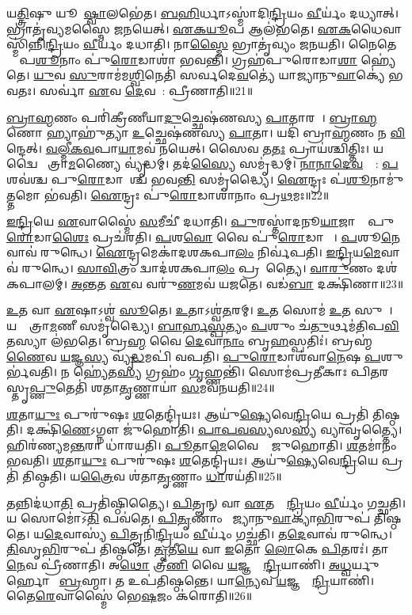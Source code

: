 𑌯\ul{𑌤𑍍𑌤𑍍𑌰𑌿}𑌷𑍁 𑌯𑍂𑌪𑍇᳚\ul{𑌷𑍍𑌵𑌾}𑌲𑌭𑍇॑𑌤।
\ul{𑌬}\ul{𑌹𑌿}𑌰𑍍𑌧𑌾\-𑌽𑌸𑍍𑌮𑌾॑𑌦𑌿\ul{𑌨𑍍𑌦𑍍𑌰𑌿}𑌯𑌂 \ul{𑌵𑍀}𑌰𑍍𑌯𑌂॑ 𑌦𑌧𑍍𑌯𑌾𑌤𑍍।
𑌭𑍍𑌰𑌾𑌤𑍃॑𑌵𑍍𑌯𑌮𑌸𑍍𑌮𑍈 𑌜𑌨𑌯𑍇𑌤𑍍।
\ul{𑌏}\ul{𑌕}\ul{𑌯𑍂}𑌪 𑌆𑌲॑𑌭𑌤𑍇।
\ul{𑌏}\ul{𑌕}𑌧𑍈𑌵𑌾𑌸𑍍𑌮𑌿॑𑌨𑍍𑌨𑌿\ul{𑌨𑍍𑌦𑍍𑌰𑌿}𑌯𑌂 \ul{𑌵𑍀}𑌰𑍍𑌯𑌂॑ 𑌦𑌧𑌾𑌤𑌿।
𑌨𑌾\ul{𑌸𑍍𑌮𑍈} 𑌭𑍍𑌰𑌾𑌤𑍃॑𑌵𑍍𑌯𑌂 𑌜𑌨𑌯𑌤𑌿।
𑌨𑍈𑌤𑍇𑌷𑌾𑌂᳚ 𑌪\ul{𑌶𑍂}𑌨𑌾𑌂 𑌪𑍁॑\ul{𑌰𑍋}𑌡𑌾𑌶𑌾॑ 𑌭𑌵𑌨𑍍𑌤𑌿।
𑌗𑍍𑌰𑌹॑𑌪𑍁𑌰𑍋𑌡𑌾\ul{𑌶𑌾} 𑌹𑍍𑌯𑍇॑𑌤𑍇।
\ul{𑌯𑍁}𑌵 \ul{𑌸𑍁}𑌰𑌾𑌮॑𑌮\ul{𑌶𑍍𑌵𑌿}𑌨𑍇𑌤𑌿॑ 𑌸𑌰𑍍𑌵𑌦𑍇\ul{𑌵}𑌤𑍍𑌯𑍇॑ 𑌯𑌾𑌜𑍍𑌯𑌾𑌨𑍁\ul{𑌵𑌾}𑌕𑍍𑌯𑍇॑ 𑌭𑌵𑌤𑌃।
𑌸𑌰𑍍𑌵𑌾॑ \ul{𑌏}𑌵 \ul{𑌦𑍇}𑌵𑌤𑌾᳚: 𑌪𑍍𑌰𑍀𑌣𑌾𑌤𑌿॥21॥

\ul{𑌬𑍍𑌰𑌾}\ul{𑌹𑍍𑌮}𑌣𑌂 𑌪𑌰𑌿॑𑌕𑍍𑌰𑍀𑌣𑍀𑌯𑌾\ul{𑌦𑍁}𑌚𑍍𑌛𑍇𑌷॑𑌣𑌸𑍍𑌯 \ul{𑌪𑌾}𑌤𑌾𑌰𑌮𑍍᳚।
\ul{𑌬𑍍𑌰𑌾}\ul{𑌹𑍍𑌮}𑌣𑍋 𑌹𑍍𑌯𑌾𑌹𑍁॑𑌤𑍍𑌯𑌾 \ul{𑌉}𑌚𑍍𑌛𑍇𑌷॑𑌣𑌸𑍍𑌯 \ul{𑌪𑌾}𑌤𑌾।
𑌯𑌦𑌿॑ 𑌬𑍍𑌰𑌾\ul{𑌹𑍍𑌮}𑌣𑌂 𑌨 \ul{𑌵𑌿}𑌨𑍍𑌦𑍇𑌤𑍍।
\ul{𑌵}\ul{𑌲𑍍𑌮𑍀}\ul{𑌕}\ul{𑌵}𑌪𑌾\ul{𑌯𑌾}𑌮𑌵॑ 𑌨𑌯𑍇𑌤𑍍।
𑌸𑍈𑌵 𑌤\ul{𑌤𑌃} 𑌪𑍍𑌰𑌾𑌯॑𑌶𑍍𑌚𑌿𑌤𑍍𑌤𑌿𑌃।
𑌯𑌦𑍍𑌵𑍈 𑌸𑍗᳚𑌤𑍍𑌰𑌾\ul{𑌮}𑌣𑍍𑌯𑍈 𑌵𑍍𑌯𑍃॑𑌦𑍍𑌧𑌮𑍍।
𑌤𑌦॑\ul{𑌸𑍍𑌯𑍈} 𑌸𑌮𑍃॑𑌦𑍍𑌧𑌮𑍍।
\ul{𑌨𑌾}\ul{𑌨𑌾}\ul{𑌦𑍇}\ul{𑌵}𑌤𑍍𑌯𑌾᳚: \ul{𑌪}𑌶𑌵॑𑌶𑍍𑌚 𑌪𑍁\ul{𑌰𑍋}𑌡𑌾𑌶𑌾᳚𑌶𑍍𑌚 𑌭𑌵\ul{𑌨𑍍𑌤𑌿} 𑌸𑌮𑍃॑𑌦𑍍𑌧𑍍𑌯𑍈।
\ul{𑌐}𑌨𑍍𑌦𑍍𑌰𑌃 𑌪॑\ul{𑌶𑍂}𑌨𑌾𑌮𑍁॑\ul{𑌤𑍍𑌤}𑌮𑍋 𑌭॑𑌵𑌤𑌿।
\ul{𑌐}𑌨𑍍𑌦𑍍𑌰𑌃 𑌪𑍁॑\ul{𑌰𑍋}𑌡𑌾𑌶𑌾॑𑌨𑌾𑌂 𑌪𑍍𑌰\ul{𑌥}𑌮𑌃॥22॥

\ul{𑌇}\ul{𑌨𑍍𑌦𑍍𑌰𑌿}𑌯𑍇 \ul{𑌏}𑌵𑌾𑌸𑍍𑌮𑍈॑ \ul{𑌸}𑌮𑍀𑌚𑍀॑ 𑌦𑌧𑌾𑌤𑌿।
\ul{𑌪𑍁}𑌰𑌸𑍍𑌤𑌾॑𑌦𑌨𑍂\ul{𑌯𑌾}𑌜𑌾𑌨𑌾𑌂᳚ 𑌪𑍁\ul{𑌰𑍋}𑌡𑌾\ul{𑌶𑍈𑌃} 𑌪𑍍𑌰𑌚॑𑌰𑌤𑌿।
\ul{𑌪}𑌶\ul{𑌵𑍋} 𑌵𑍈 𑌪𑍁॑\ul{𑌰𑍋}𑌡𑌾𑌶𑌾𑌃᳚।
\ul{𑌪}𑌶𑍂\ul{𑌨𑍇}𑌵𑌾𑌵॑ 𑌰𑍁𑌨𑍍𑌧𑍇।
\ul{𑌐}𑌨𑍍𑌦𑍍𑌰𑌮𑍇𑌕𑌾॑𑌦𑌶𑌕𑌪𑌾\ul{𑌲𑌂} 𑌨𑌿𑌰𑍍𑌵॑𑌪𑌤𑌿।
\ul{𑌇}\ul{𑌨𑍍𑌦𑍍𑌰𑌿}𑌯\ul{𑌮𑍇}𑌵𑌾𑌵॑ 𑌰𑍁𑌨𑍍𑌧𑍇।
\ul{𑌸𑌾}\ul{𑌵𑌿}𑌤𑍍𑌰𑌂 𑌦𑍍𑌵𑌾𑌦॑𑌶𑌕𑌪𑌾\ul{𑌲𑌂} 𑌪𑍍𑌰𑌸𑍂᳚𑌤𑍍𑌯𑍈।
\ul{𑌵𑌾}\ul{𑌰𑍁}𑌣𑌂 𑌦𑌶॑𑌕𑌪𑌾𑌲𑌮𑍍।
\ul{𑌅}\ul{𑌨𑍍𑌤}𑌤 \ul{𑌏}𑌵 𑌵𑌰𑍁॑\ul{𑌣}𑌮𑌵॑ 𑌯𑌜𑌤𑍇।
𑌵𑌡॑\ul{𑌬𑌾} 𑌦𑌕𑍍𑌷𑌿॑𑌣𑌾॥23॥

\ul{𑌉}𑌤 𑌵𑌾 \ul{𑌏}𑌷𑌾\-𑌽𑌶𑍍𑌵॑ \ul{𑌸𑍂}𑌤𑍇।
\ul{𑌉}𑌤𑌾𑌽𑌶𑍍𑌵॑\ul{𑌤}𑌰𑌮𑍍।
\ul{𑌉}𑌤 𑌸𑍋𑌮॑ \ul{𑌉}𑌤 𑌸𑍁𑌰𑌾᳚।
𑌯𑌥𑍍𑌸𑍗᳚𑌤𑍍𑌰𑌾\ul{𑌮}𑌣𑍀 𑌸𑌮𑍃॑𑌦𑍍𑌧𑍍𑌯𑍈।
\ul{𑌬𑌾}\ul{𑌰𑍍}\ul{𑌹}\ul{𑌸𑍍𑌪}𑌤𑍍𑌯𑌂 \ul{𑌪}𑌶𑍁𑌂 𑌚॑\ul{𑌤𑍁}𑌰𑍍𑌥𑌮॑𑌤𑌿𑌪\ul{𑌵𑌿}𑌤𑌸𑍍𑌯𑌾 𑌲॑𑌭𑌤𑍇।
𑌬𑍍𑌰\ul{𑌹𑍍𑌮} 𑌵𑍈 \ul{𑌦𑍇}𑌵𑌾\ul{𑌨𑌾𑌂} 𑌬𑍃\ul{𑌹}𑌸𑍍𑌪𑌤𑌿𑌃॑।
𑌬𑍍𑌰𑌹𑍍𑌮॑\ul{𑌣𑍈}𑌵 \ul{𑌯}𑌜𑍍𑌞\ul{𑌸𑍍𑌯} 𑌵𑍍𑌯𑍃॑\ul{𑌦𑍍𑌧}𑌮𑌪𑌿॑ 𑌵𑌪𑌤𑌿।
\ul{𑌪𑍁}\ul{𑌰𑍋}𑌡𑌾𑌶॑𑌵𑌾\ul{𑌨𑍇}𑌷 \ul{𑌪}𑌶𑍁𑌰𑍍𑌭॑𑌵𑌤𑌿।
𑌨 𑌹𑍍𑌯𑍇॑𑌤\ul{𑌸𑍍𑌯} 𑌗𑍍𑌰𑌹𑌂॑ \ul{𑌗𑍃}𑌹𑍍𑌣𑌨𑍍𑌤𑌿॑।
𑌸𑍋𑌮॑𑌪𑍍𑌰𑌤𑍀𑌕𑌾𑌃 𑌪𑌿𑌤𑌰𑌸𑍍𑌤𑍃\ul{𑌪𑍍𑌣𑍁}𑌤𑍇𑌤𑌿॑ 𑌶𑌤𑌾\ul{𑌤𑍃}𑌣𑍍𑌣𑌾𑌯𑌾॑ \ul{𑌸}𑌮𑌵॑𑌨𑌯𑌤𑌿॥24॥

\ul{𑌶}𑌤𑌾\ul{𑌯𑍁𑌃} 𑌪𑍁𑌰𑍁॑𑌷𑌃 \ul{𑌶}𑌤𑍇𑌨𑍍𑌦𑍍𑌰𑌿॑𑌯𑌃।
𑌆𑌯𑍁॑\ul{𑌷𑍍𑌯𑍇}𑌵𑍇\ul{𑌨𑍍𑌦𑍍𑌰𑌿}𑌯𑍇 𑌪𑍍𑌰𑌤𑌿॑ 𑌤𑌿𑌷𑍍𑌠𑌤𑌿।
𑌦𑌕𑍍𑌷𑌿॑\ul{𑌣𑍇}\-𑌽𑌗𑍍𑌨𑍗 𑌜𑍁॑𑌹𑍋𑌤𑌿।
\ul{𑌪𑌾}\ul{𑌪}\ul{𑌵}\ul{𑌸𑍍𑌯}𑌸\ul{𑌸𑍍𑌯} 𑌵𑍍𑌯𑌾𑌵𑍃॑𑌤𑍍𑌤𑍍𑌯𑍈।
𑌹𑌿𑌰॑𑌣𑍍𑌯𑌮\ul{𑌨𑍍𑌤}𑌰𑌾 𑌧𑌾॑𑌰𑌯𑌤𑌿।
\ul{𑌪𑍂}𑌤𑌾\ul{𑌮𑍇}𑌵𑍈𑌨𑌾𑌂᳚ 𑌜𑍁𑌹𑍋𑌤𑌿।
\ul{𑌶}𑌤𑌮𑌾॑𑌨𑌂 𑌭𑌵𑌤𑌿।
\ul{𑌶}𑌤𑌾\ul{𑌯𑍁𑌃} 𑌪𑍁𑌰𑍁॑𑌷𑌃 \ul{𑌶}𑌤𑍇𑌨𑍍𑌦𑍍𑌰𑌿॑𑌯𑌃।
𑌆𑌯𑍁॑\ul{𑌷𑍍𑌯𑍇}𑌵𑍇\ul{𑌨𑍍𑌦𑍍𑌰𑌿}𑌯𑍇 𑌪𑍍𑌰𑌤𑌿॑ 𑌤𑌿𑌷𑍍𑌠𑌤𑌿।
𑌯\ul{𑌤𑍍𑌰𑍈}𑌵 𑌶॑𑌤𑌾\ul{𑌤𑍃}𑌣𑍍𑌣𑌾𑌂 \ul{𑌧𑌾}𑌰𑌯॑𑌤𑌿॥25॥

𑌤𑌨𑍍𑌨𑌿𑌦॑𑌧𑌾\ul{𑌤𑌿} 𑌪𑍍𑌰𑌤𑌿॑\-𑌷𑍍𑌠𑌿𑌤𑍍𑌯𑍈।
\ul{𑌪𑌿}𑌤𑍄𑌨𑍍 𑌵𑌾 \ul{𑌏}𑌤𑌸𑍍𑌯𑍇᳚\ul{𑌨𑍍𑌦𑍍𑌰𑌿}𑌯𑌂 \ul{𑌵𑍀}𑌰𑍍𑌯𑌂॑ 𑌗𑌚𑍍𑌛𑌤𑌿।
𑌯 𑌸𑍋𑌮𑍋॑𑌽\ul{𑌤𑌿} 𑌪𑌵॑𑌤𑍇।
\ul{𑌪𑌿}\ul{𑌤𑍃}𑌣𑌾𑌂 𑌯𑌾᳚𑌜𑍍𑌯𑌾𑌨𑍁\ul{𑌵𑌾}𑌕𑍍𑌯𑌾॑\ul{𑌭𑌿}𑌰𑍁𑌪॑ 𑌤𑌿𑌷𑍍𑌠𑌤𑍇।
𑌯\ul{𑌦𑍇}𑌵𑌾𑌸𑍍𑌯॑ \ul{𑌪𑌿}𑌤𑍄𑌨𑌿॑\ul{𑌨𑍍𑌦𑍍𑌰𑌿}𑌯𑌂 \ul{𑌵𑍀}𑌰𑍍𑌯𑌂॑ 𑌗𑌚𑍍𑌛॑𑌤𑌿।
𑌤\ul{𑌦𑍇}𑌵𑌾𑌵॑ 𑌰𑍁𑌨𑍍𑌧𑍇।
\ul{𑌤𑌿}𑌸𑍃\ul{𑌭𑌿}𑌰𑍁𑌪॑ 𑌤𑌿𑌷𑍍𑌠𑌤𑍇।
\ul{𑌤𑍃}𑌤𑍀\ul{𑌯𑍇} 𑌵𑌾 \ul{𑌇}𑌤𑍋 \ul{𑌲𑍋}𑌕𑍇 \ul{𑌪𑌿}𑌤𑌰𑌃॑।
𑌤𑌾\ul{𑌨𑍇}𑌵 𑌪𑍍𑌰𑍀॑𑌣𑌾𑌤𑌿।
𑌅\ul{𑌥𑍋} 𑌤𑍍𑌰𑍀\ul{𑌣𑌿} 𑌵𑍈 \ul{𑌯}𑌜𑍍𑌞𑌸𑍍𑌯𑍇᳚\ul{𑌨𑍍𑌦𑍍𑌰𑌿}𑌯𑌾𑌣𑌿॑।
\ul{𑌅}\ul{𑌧𑍍𑌵}𑌰𑍍𑌯𑍁𑌰𑍍\mbox{}𑌹𑍋𑌤𑌾᳚ \ul{𑌬𑍍𑌰}𑌹𑍍𑌮𑌾।
𑌤 𑌉𑌪॑𑌤𑌿𑌷𑍍𑌠𑌨𑍍𑌤𑍇।
𑌯𑌾\ul{𑌨𑍍𑌯𑍇}𑌵 \ul{𑌯}𑌜𑍍𑌞𑌸𑍍𑌯𑍇᳚\ul{𑌨𑍍𑌦𑍍𑌰𑌿}𑌯𑌾𑌣𑌿॑।
𑌤𑍈\ul{𑌰𑍇}𑌵𑌾𑌸𑍍𑌮𑍈॑ 𑌭𑍇\ul{𑌷}𑌜𑌂 𑌕॑𑌰𑍋𑌤𑌿॥26॥\anuvakamend[\ul{𑌪𑍍𑌰𑍀}\ul{𑌣𑌾}\ul{𑌤𑌿} \ul{𑌪𑍍𑌰}\ul{𑌥}𑌮𑍋 𑌦𑌕𑍍𑌷𑌿॑𑌣𑌾 \ul{𑌸}𑌮𑌵॑𑌨𑌯𑌤𑌿 \ul{𑌧𑌾}𑌰𑌯॑𑌤𑍀\ul{𑌨𑍍𑌦𑍍𑌰𑌿}𑌯𑌾𑌣𑌿॑ \ul{𑌚}𑌤𑍍𑌵𑌾𑌰𑌿॑ 𑌚]


